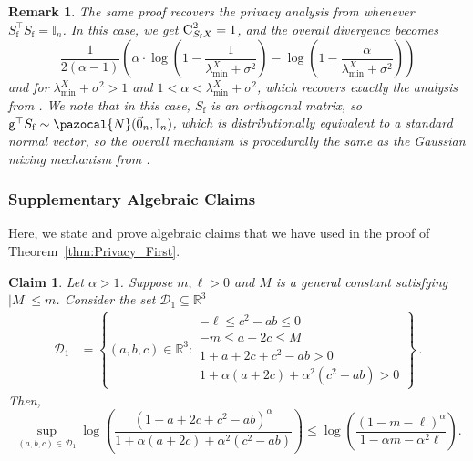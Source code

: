 \documentclass[11pt]{article}
\newtheorem{claim}{Claim}
\theoremstyle{definition}
\theoremstyle{plain}
\newtheorem{remark}{Remark}
\providecommand{\theoremref}[1]{Theorem~\ref{#1}}
\newcommand{\reals}{\mathbb{R}}
\providecommand{\brI}{\mathbb{I}}
\newcommand{\abs}[1]{\left| #1 \right|}
\newcommand{\pN}{\pazocal{N}}
\begin{document}
\vspace{1.0em}
\begin{remark}
\normalfont
The same proof recovers the privacy analysis from \citet{lev2025gaussianmix} whenever $S_{\mathrm{f}}^{\top}S_{\mathrm{f}} = \brI_n$. In this case, we get $\textsc{C}^2_{S_{\mathrm{f}}X} = 1$, and the overall divergence becomes 
\begin{equation}
    \frac{1}{2(\alpha - 1)}\left(\alpha \cdot \log\left(1 - \frac{1}{\lambda^{X}_{\min} + \sigma^2}\right) - \log\left(1 - \frac{\alpha}{\lambda^{X}_{\min} + \sigma^2}\right)\right)
\end{equation}
and for $\lambda^{X}_{\min} + \sigma^2 > 1$ and $1 < \alpha < \lambda^{X}_{\min} + \sigma^2$, which recovers exactly the analysis from \citet[Appendix.~B]{lev2025gaussianmix}. We note that in this case, $S_{\mathrm{f}}$ is an orthogonal matrix, so $\mathsf{g}^{\top}S_{\mathrm{f}} \sim \pN(\vec{0}_n, \brI_n)$, which is distributionally equivalent to a standard normal vector, so the overall mechanism is procedurally the same as the Gaussian mixing mechanism from \citet{lev2025gaussianmix}. 
\end{remark}

\subsubsection{Supplementary Algebraic Claims}

Here, we state and prove algebraic claims that we have used in the proof of \theoremref{thm:Privacy_First}.

\begin{claim}
    \label{claim:renyi-div-upper-bound}
    Let \(\alpha > 1\). Suppose \(m, \ell > 0\) and \(M\) is a general constant satisfying $\abs{M} \leq m$. Consider the set \(\mathcal{D}_{1} \subseteq \reals^{3}\)
    \begin{align*}
        \mathcal{D}_{1} &= \left\{(a, b, c) \in \reals^{3}: \begin{array}{l}
            -\ell \leq c^{2} - ab \leq 0 \\
            -m \leq a + 2c \leq M \\
            1 + a + 2c + c^{2} - ab > 0 \\
            1 + \alpha(a + 2c) + \alpha^{2}(c^{2} - ab) > 0
        \end{array}\right\}~.
    \end{align*}
    Then,
    \begin{equation*}
        \sup_{(a, b, c) \in \mathcal{D}_{1}} \log\left(\frac{(1 + a + 2c + c^{2} - ab)^{\alpha}}{1 + \alpha(a + 2c) + \alpha^{2}(c^{2} - ab)}\right) \leq \log\left(\frac{(1 - m - \ell)^{\alpha}}{1 - \alpha m - \alpha^{2}\ell}\right).
    \end{equation*}
\end{claim}
\end{document}
